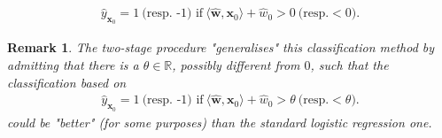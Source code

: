 \documentclass[]{article}
\newcommand{\w}{\mathbf{w}}
\newcommand{\x}{\mathbf{x}}
\newtheorem{remark}[theorem]{Remark}
\begin{document}
\begin{align*}
\hat{y}_{\x_0}=1 \ \text{(resp. -1) if}\ \langle\hat{\w},\x_0\rangle+\hat{w}_0>0 \  \text{(resp.} <0).
\end{align*}

\begin{remark}
The two-stage procedure "generalises" this classification method by admitting that there is a $\theta\in \mathbb{R}$, possibly different from $0$, such that the classification based on 
\begin{align*}
\hat{y}_{\x_0}=1 \ \text{(resp. -1) if}\ \langle\hat{\w},\x_0\rangle+\hat{w}_0>\theta \  \text{(resp.} <\theta).
\end{align*}
could be "better" (for some purposes) than the standard logistic regression one. 
\end{remark}




\end{document}
